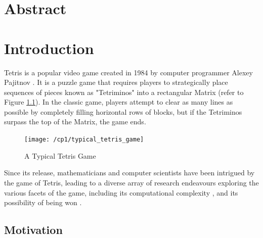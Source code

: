 \documentclass[a4paper, 12pt]{extreport}
\begin{document}
	\chapter*{Abstract}
	
	
	\tableofcontents
	
	\chapter{Introduction}
	
		
		Tetris is a popular video game created in 1984 by computer programmer Alexey Pajitnov  \cite{about-tetris}. It is a puzzle game that requires players to strategically place sequences of pieces known as "Tetriminos" into a rectangular Matrix (refer to Figure \ref{tetrisgame}). In the classic game, players attempt to clear as many lines as possible by completely filling horizontal rows of blocks, but if the Tetriminos surpass the top of the Matrix, the game ends.
		
		\begin{figure}[h]
			\centering
			\texttt{[image: /cp1/typical\_tetris\_game]}
			\caption{A Typical Tetris Game}
			\label{tetrisgame}
		\end{figure}
		
		Since its release, mathematicians and computer scientists have been intrigued by the game of Tetris, leading to a diverse array of research endeavours exploring the various facets of the game, including its computational complexity \cite{tetris-is-hard-even-to-approx}, and its possibility of being won \cite{can-you-win-at-tetris} \cite{how-to-lose-at-tetris}.
		
		\section{Motivation}
		
			
\end{document}
